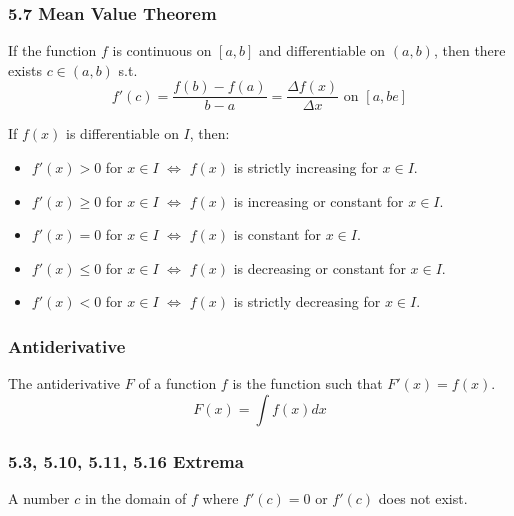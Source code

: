\subsubsection*{5.7 Mean Value Theorem}

\begin{theorem}
  If the function $f$ is continuous on $[a, b]$ and differentiable on $(a, b)$, then there exists $c \in (a, b)$ s.t.
  \[
    f'(c) = \frac{f(b) - f(a)}{b - a} = \frac{\Delta f(x)}{\Delta x} \text{ on } [a, be]
  \]
\end{theorem}

\begin{theorem}
  If $f(x)$ is differentiable on $I$, then:
  \begin{itemize}
    \item $f'(x) > 0$ for $x \in I$ $\iff$ $f(x)$ is strictly increasing for $x \in I$.
    \item $f'(x) \geq 0$ for $x \in I$ $\iff$ $f(x)$ is increasing or constant for $x \in I$.
    \item $f'(x) = 0$ for $x \in I$ $\iff$ $f(x)$ is constant for $x \in I$.
    \item $f'(x) \leq 0$ for $x \in I$ $\iff$ $f(x)$ is decreasing or constant for $x \in I$.
    \item $f'(x) < 0$ for $x \in I$ $\iff$ $f(x)$ is strictly decreasing for $x \in I$.
  \end{itemize}
\end{theorem}

\subsubsection*{Antiderivative}

\begin{definition}[Antiderivative]
  The antiderivative $F$ of a function $f$ is the function such that $F'(x) = f(x)$.
  \[
    F(x) = \int f(x) dx
  \]
\end{definition}

\subsubsection*{5.3, 5.10, 5.11, 5.16 Extrema}

\begin{definition}
  A number $c$ in the domain of $f$ where $f'(c) = 0$ or $f'(c)$ does not exist.
\end{definition}


